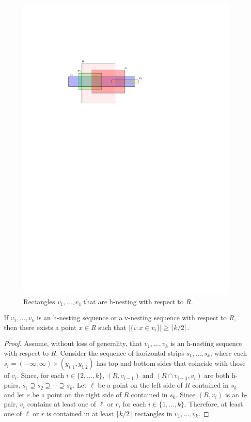 \documentclass[lotsofwhite]{patmorin}
\begin{document}
\begin{figure}
 \begin{center}
    \includegraphics{figs/nesting}
 \end{center}
 \caption{Rectangles $v_1,\ldots,v_4$ that are h-nesting with respect to $R$.}
\end{figure}

\begin{lem}
   If $v_1,\ldots,v_k$ is an h-nesting sequence or a v-nesting sequence
   with respect to $R$, then there exists a point $x\in R$ such that $|\{
   i: x\in v_i \}|\ge \lceil k/2\rceil$.
\end{lem}

\begin{proof}
   Assume, without loss of generality, that $v_1,\ldots,v_k$
   is an h-nesting sequence with respect to $R$.  Consider the
   sequence of horizontal strips $s_1,\ldots,s_k$, where each
   $s_i=(-\infty,\infty)\times (y_{i,1},y_{i,2})$ has top and
   bottom sides that coincide with those of $v_i$. Since, for each
   $i\in\{2,\ldots,k\}$, $(R,v_{i-1})$ and $(R\cap v_{i-1},v_i)$
   are both h-pairs, $s_1\supseteq s_2\supseteq\cdots\supseteq s_k$.
   Let $\ell$ be a point on the left side of $R$ contained in $s_k$
   and let $r$ be a point on the right side of $R$ contained in $s_k$.
   Since $(R,v_i)$ is an h-pair, $v_i$ contains at least one of $\ell$
   or $r$, for each $i\in\{1,\ldots,k\}$.  Therefore, at least one of
   $\ell$ or $r$ is contained in at least $\lceil k/2\rceil$ rectangles
   in $v_1,\ldots,v_k$.
\end{proof}
\end{document}
